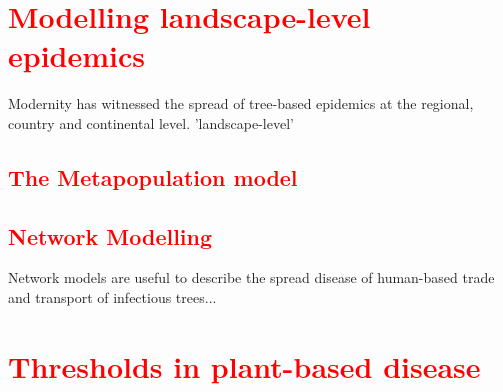 \section{\textcolor{red}{Modelling landscape-level epidemics}}

Modernity has witnessed the spread of tree-based epidemics at the regional, country and continental level. 'landscape-level'

\subsection{\textcolor{red}{The Metapopulation model}}
\blindtext

\subsection{\textcolor{red}{Network Modelling}}

Network models are useful to describe the spread disease of human-based trade and transport of infectious trees...

\blindtext


\section{\textcolor{red}{Thresholds in plant-based disease}}

